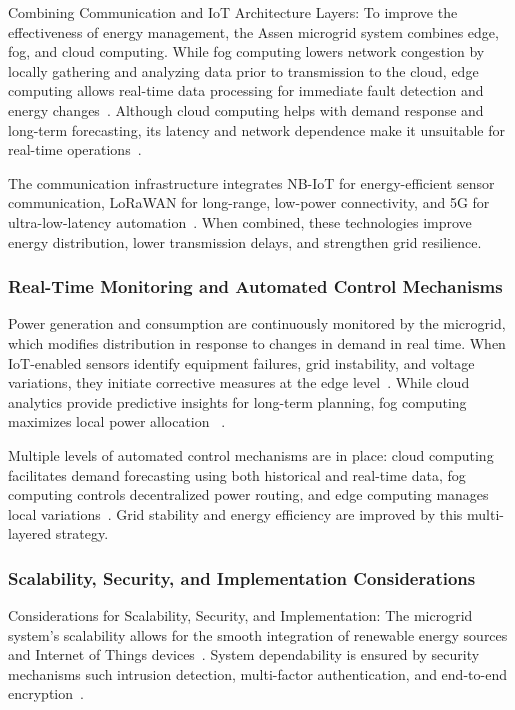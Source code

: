 \documentclass[conference]{IEEEtran}
\begin{document}
Combining Communication and IoT Architecture Layers: To improve the effectiveness of energy management, the Assen microgrid system combines edge, fog, and cloud computing. While fog computing lowers network congestion by locally gathering and analyzing data prior to transmission to the cloud, edge computing allows real-time data processing for immediate fault detection and energy changes~\cite{10474733,9584756}. Although cloud computing helps with demand response and long-term forecasting, its latency and network dependence make it unsuitable for real-time operations~\cite{9823928}. 

The communication infrastructure integrates NB-IoT for energy-efficient sensor communication, LoRaWAN for long-range, low-power connectivity, and 5G for ultra-low-latency automation~\cite{8752482, smartcities4020024, 9023471}. When combined, these technologies improve energy distribution, lower transmission delays, and strengthen grid resilience.

\subsubsection{Real-Time Monitoring and Automated Control Mechanisms}

Power generation and consumption are continuously monitored by the microgrid, which modifies distribution in response to changes in demand in real time. When IoT-enabled sensors identify equipment failures, grid instability, and voltage variations, they initiate corrective measures at the edge level~\cite{smartcities4020024}. While cloud analytics provide predictive insights for long-term planning, fog computing maximizes local power allocation ~\cite{7123563}. 

Multiple levels of automated control mechanisms are in place: cloud computing facilitates demand forecasting using both historical and real-time data, fog computing controls decentralized power routing, and edge computing manages local variations~\cite{CloudFogMist2021, 8752482}. Grid stability and energy efficiency are improved by this multi-layered strategy.

\subsubsection{Scalability, Security, and Implementation Considerations}

Considerations for Scalability, Security, and Implementation: The microgrid system's scalability allows for the smooth integration of renewable energy sources and Internet of Things devices~\cite{9257923}. System dependability is ensured by security mechanisms such intrusion detection, multi-factor authentication, and end-to-end encryption~\cite{9823928, 7123563}. 
\end{document}
